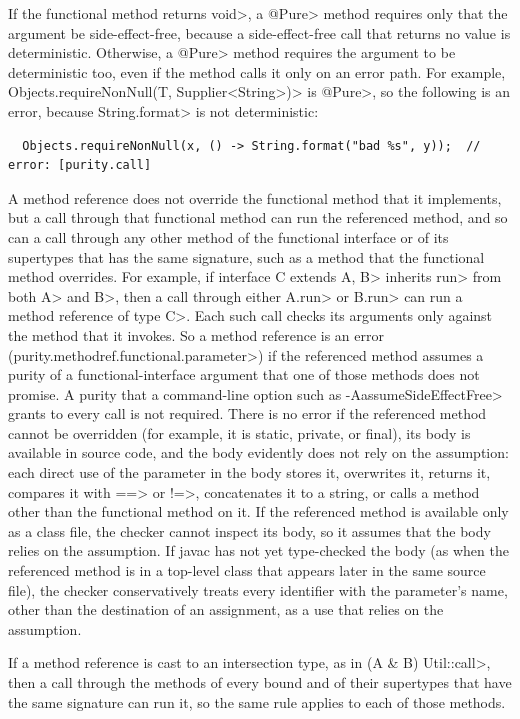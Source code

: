 If the functional method returns \<void>, a \<@Pure> method requires only
that the argument be side-effect-free, because a side-effect-free call that
returns no value is deterministic.  Otherwise, a \<@Pure> method requires the
argument to be deterministic too, even if the method calls it only on an
error path.  For example, \<Objects.requireNonNull(T, Supplier<String>)> is
\<@Pure>, so the following is an error, because \<String.format> is not
deterministic:

\begin{Verbatim}
  Objects.requireNonNull(x, () -> String.format("bad %s", y));  // error: [purity.call]
\end{Verbatim}

A method reference does not override the functional method that it
implements, but a call through that functional method can run the referenced
method, and so can a call through any other method of the functional
interface or of its supertypes that has the same signature, such as a method
that the functional method overrides.  For example, if \<interface C extends
A, B> inherits \<run> from both \<A> and \<B>, then a call through either
\<A.run> or \<B.run> can run a method reference of type \<C>.  Each
such call checks its arguments only against the method that it invokes.  So a
method reference is an error (\<purity.methodref.functional.parameter>) if
the referenced method assumes a purity of a functional-interface argument that
one of those methods does not promise.  A purity that a command-line option
such as \<-AassumeSideEffectFree> grants to every call is not required.  There
is no error if the referenced method cannot be overridden (for example, it is
static, private, or final), its body is available in source code, and the body
evidently does not rely on the assumption:  each direct use of the parameter
in the body stores it, overwrites it, returns it, compares it with \<==> or
\<!=>, concatenates it to a string, or calls a method other than the
functional method on it.  If the referenced method is available only as a
class file, the checker cannot inspect its body, so it assumes that the body
relies on the assumption.  If javac has not yet type-checked the body (as
when the referenced method is in a top-level class that appears later in the
same source file), the checker conservatively treats every identifier with
the parameter's name, other than the destination of an assignment, as a use
that relies on the assumption.

If a method reference is cast to an intersection type, as in
\<(A \& B) Util::call>, then a call through the methods of every bound and of
their supertypes that have the same signature can run it, so the same rule
applies to each of those methods.

